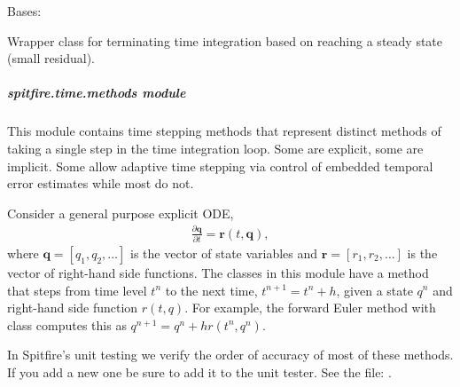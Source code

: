 \documentclass[letterpaper,10pt,english]{sphinxmanual}
\begin{document}
\begin{fulllineitems}
\label{\detokenize{spitfire.time.governor:spitfire.time.governor.Steady}}
Bases: 

Wrapper class for terminating time integration based on reaching a steady state (small residual).

\end{fulllineitems}



\subparagraph{spitfire.time.methods module}
\label{\detokenize{spitfire.time.methods:module-spitfire.time.methods}}\label{\detokenize{spitfire.time.methods:spitfire-time-methods-module}}\label{\detokenize{spitfire.time.methods::doc}}
This module contains time stepping methods that represent distinct methods of taking a single step in the time integration loop.
Some are explicit, some are implicit.
Some allow adaptive time stepping via control of embedded temporal error estimates while most do not.

Consider a general purpose explicit ODE,
\begin{equation}\label{equation:spitfire.time.methods:spitfire.time.methods:0}
\begin{split}\frac{\partial \boldsymbol{q}}{\partial t} = \boldsymbol{r}(t, \boldsymbol{q}),\end{split}
\end{equation}
where \(\boldsymbol{q}=[q_1,q_2,\ldots]\) is the vector of state variables
and \(\boldsymbol{r}=[r_1,r_2,\ldots]\) is the vector of right-hand side functions.
The classes in this module have a  method that steps from time level \(t^n\) to
the next time,  \(t^{n+1}=t^n + h\), given a state \(q^n\) and right-hand side function \(r(t,q)\).
For example, the forward Euler method with class  computes this as \(q^{n+1}=q^n + hr(t^n,q^n)\).

In Spitfire’s unit testing we verify the order of accuracy of most of these methods.
If you add a new one be sure to add it to the unit tester.
See the file: .
\end{document}

